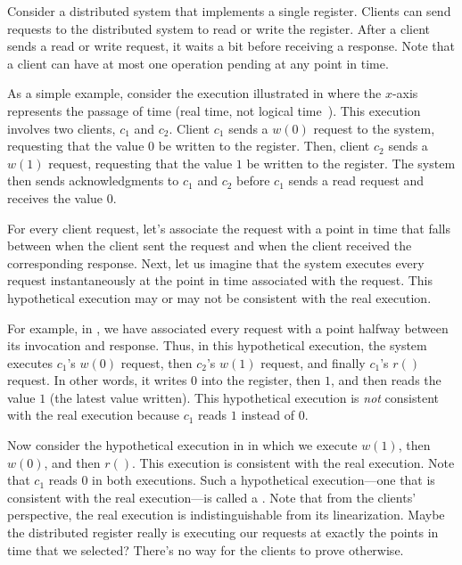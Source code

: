 Consider a distributed system that implements a single register. Clients can
send requests to the distributed system to read or write the register. After a
client sends a read or write request, it waits a bit before receiving a
response. Note that a client can have at most one operation pending at any
point in time.

{}

As a simple example, consider the execution illustrated in
 where the $x$-axis represents the passage of
time (real time, not logical time~\cite{lamport2019time}). This execution
involves two clients, $c_1$ and $c_2$. Client $c_1$ sends a $w(0)$ request to
the system, requesting that the value $0$ be written to the register. Then,
client $c_2$ sends a $w(1)$ request, requesting that the value $1$ be written
to the register. The system then sends acknowledgments to $c_1$ and $c_2$
before $c_1$ sends a read request and receives the value $0$.

For every client request, let's associate the request with a point in time that
falls between when the client sent the request and when the client received the
corresponding response. Next, let us imagine that the system executes every
request instantaneously at the point in time associated with the request. This
hypothetical execution may or may not be consistent with the real execution.

For example, in , we have associated every
request with a point halfway between its invocation and response. Thus, in this
hypothetical execution, the system executes $c_1$'s $w(0)$ request, then
$c_2$'s $w(1)$ request, and finally $c_1$'s $r()$ request. In other words, it
writes $0$ into the register, then $1$, and then reads the value $1$ (the
latest value written). This hypothetical execution is \emph{not} consistent
with the real execution because $c_1$ reads $1$ instead of $0$.

Now consider the hypothetical execution in  in
which we execute $w(1)$, then $w(0)$, and then $r()$. This execution is
consistent with the real execution. Note that $c_1$ reads $0$ in both
executions. Such a hypothetical execution---one that is consistent with the
real execution---is called a . Note that from the
clients' perspective, the real execution is indistinguishable from its
linearization. Maybe the distributed register really is executing our requests
at exactly the points in time that we selected? There's no way for the clients
to prove otherwise.


